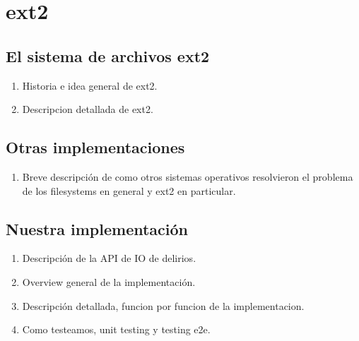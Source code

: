 \section{ext2}

\subsection{El sistema de archivos ext2}
\begin{enumerate}
  \item Historia e idea general de ext2.
  \item Descripcion detallada de ext2.
\end{enumerate}

\subsection{Otras implementaciones}
\begin{enumerate}
  \item Breve descripción de como otros sistemas operativos resolvieron el problema de los filesystems en general y ext2 en particular.
\end{enumerate}

\subsection{Nuestra implementación}
\begin{enumerate}
  \item Descripción de la API de IO de delirios.
  \item Overview general de la implementación.
  \item Descripción detallada, funcion por funcion de la implementacion.
  \item Como testeamos, unit testing y testing e2e.
\end{enumerate}

